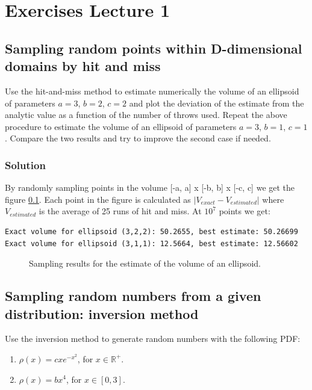 \documentclass[../main.tex]{subfiles}
\begin{document}
\chapter*{Exercises Lecture 1}

\section{Sampling random points within D-dimensional domains by hit and miss}
Use the hit-and-miss method to estimate numerically the volume of an ellipsoid of parameters $a=3$, $b=2$, $c=2$ and plot the deviation of the estimate from the analytic value as a function of the number of throws used.
Repeat the above procedure to estimate the volume of an ellipsoid of parameters $a=3$, $b=1$, $c=1$. Compare the two results and try to improve the second case if needed.

\subsection{Solution}
By randomly sampling points in the volume [-a, a] x [-b, b] x [-c, c] we get the figure \ref{fig: ex_1_1}. Each point in the figure is calculated as $|V_{exact} - V_{estimated}|$ where $V_{estimated}$ is the average of 25 runs of hit and miss.
At $10^7$ points we get:
\begin{verbatim}
Exact volume for ellipsoid (3,2,2): 50.2655, best estimate: 50.26699
Exact volume for ellipsoid (3,1,1): 12.5664, best estimate: 12.56602
\end{verbatim}


\begin{figure}[ht!]
    \centerline{}
    \caption{Sampling results for the estimate of the volume of an ellipsoid.}
    \label{fig: ex_1_1}
\end{figure}


%   


\section{Sampling random numbers from a given distribution: inversion method}
Use the inversion method to generate random numbers with the following PDF:
\begin{enumerate}
    \item $\rho(x) = c x e^{-x^2}$, for $x \in \mathbb{R}^+$.
    \item $\rho(x) = b x^4$, for $x \in [0, 3]$.
\end{enumerate}
\end{document}

